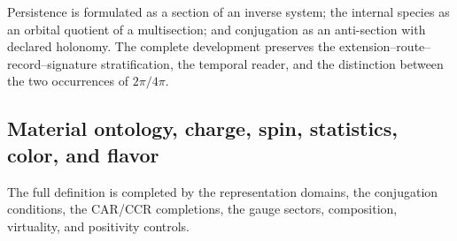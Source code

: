 Persistence is formulated as a section of an inverse system; the internal
species as an orbital quotient of a multisection; and conjugation as an
anti-section with declared holonomy. The complete development preserves the
extension--route--record--signature stratification, the temporal reader, and the
distinction between the two occurrences of \(2\pi/4\pi\).

\begingroup
\let\chapter\section
\let\section\subsection
\let\subsection\subsubsection
\let\subsubsection\paragraph
\let\clearpage\relax
\let\cleardoublepage\relax

\endgroup

\section{Material ontology, charge, spin, statistics, color, and flavor}
The full definition is completed by the representation domains, the
conjugation conditions, the CAR/CCR completions, the gauge sectors,
composition, virtuality, and positivity controls.

